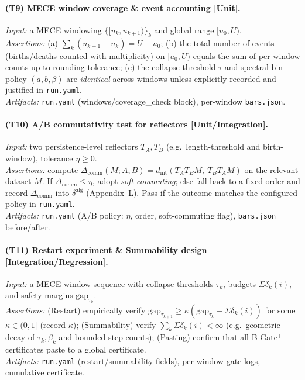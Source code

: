 \documentclass[11pt]{article}
\numberwithin{equation}{section}
\theoremstyle{plain}
\theoremstyle{definition}
\theoremstyle{remark}
\DeclareRobustCommand{\hyp}{\nobreakdash-}
\theoremstyle{plain}
\theoremstyle{definition}
\numberwithin{equation}{section}
\theoremstyle{definition}
\numberwithin{equation}{section}
\theoremstyle{plain}
\theoremstyle{definition}
\theoremstyle{remark}
\providecommand{\n}{\unskip\space}
\begin{document}
\paragraph{(T9) MECE window coverage \& event accounting [Unit].}
\emph{Input:} a MECE windowing \(\{[u_k,u_{k+1})\}_k\) and global range \([u_0,U)\).\\\n\emph{Assertions:} (a) \(\sum_k (u_{k+1}-u_k)=U-u_0\); (b) the total number of events (births/deaths counted with multiplicity) on \([u_0,U)\) equals the sum of per\hyp window counts up to rounding tolerance; (c) the collapse threshold \(\tau\) and spectral bin policy \((a,b,\beta)\) are \emph{identical} across windows unless explicitly recorded and justified in \texttt{run.yaml}.\\\n\emph{Artifacts:} \texttt{run.yaml} (windows/coverage\_check block), per\hyp window \texttt{bars.json}.

\paragraph{(T10) A/B commutativity test for reflectors [Unit/Integration].}
\emph{Input:} two persistence\hyp level reflectors \(T_A,T_B\) (e.g.\ length\hyp threshold and birth\hyp window), tolerance \(\eta\ge 0\).\\\n\emph{Assertions:} compute \(\Delta_{\mathrm{comm}}(M;A,B)=d_{\mathrm{int}}(T_A T_B M,\ T_B T_A M)\) on the relevant dataset \(M\). If \(\Delta_{\mathrm{comm}}\le \eta\), adopt \emph{soft\hyp commuting}; else fall back to a fixed order and record \(\Delta_{\mathrm{comm}}\) into \(\delta^{\mathrm{alg}}\) (Appendix~L). Pass if the outcome matches the configured policy in \texttt{run.yaml}.\\\n\emph{Artifacts:} \texttt{run.yaml} (A/B policy: \(\eta\), order, soft\hyp commuting flag), \texttt{bars.json} before/after.

\paragraph{(T11) Restart experiment \& Summability design [Integration/Regression].}
\emph{Input:} a MECE window sequence with collapse thresholds \(\tau_k\), budgets \(\Sigma\delta_k(i)\), and safety margins \(\mathrm{gap}_{\tau_k}\).\\\n\emph{Assertions:} (Restart) empirically verify \(\mathrm{gap}_{\tau_{k+1}}\ge \kappa(\mathrm{gap}_{\tau_k}-\Sigma\delta_k(i))\) for some \(\kappa\in(0,1]\) (record \(\kappa\)); (Summability) verify \(\sum_k \Sigma\delta_k(i)<\infty\) (e.g.\ geometric decay of \(\tau_k,\beta_k\) and bounded step counts); (Pasting) confirm that all B\hyp Gate\(^{+}\) certificates paste to a global certificate.\\\n\emph{Artifacts:} \texttt{run.yaml} (restart/summability fields), per\hyp window gate logs, cumulative certificate.
\end{document}
